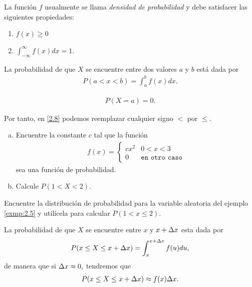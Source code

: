 	La función $f$ usualmente se llama \emph{densidad de probabilidad} y debe satisfacer las siguientes propiedades:
	\begin{enumerate}
		\item $f(x)\geq 0 $
		\item $\displaystyle \int_{-\infty}^{\infty}f(x)dx=1.$
	\end{enumerate}




	La probabilidad de que $X$ se encuentre entre dos valores $a$ y $b$ está dada por
	\begin{align}
		\label{2.8}
		P(a < x <b)=\int_{a}^{b}f(x)dx.
	\end{align}



	\begin{align}
		\label{exmp:2.4}
		P(X=a)=0.
	\end{align}


Por tanto, en \eqref{2.8} podemos reemplazar cualquier signo $<$ por $\leq.$


	\begin{ejemplo}
		\label{exmp:2.5}
		\begin{enumerate}[(a)]
			\item Encuentre la constante $c$ tal que la función
			\begin{align}
				f(x)=
				\begin{cases}
					cx^{2} & 0 < x < 3 \\
					0 & \texttt{en otro caso}
				\end{cases}
			\end{align}
			sea una función de probabilidad. 
			\item Calcule $P(1 < X < 2).$
		\end{enumerate}

	\end{ejemplo}



	\begin{ejemplo}
	  \label{exmp:2.6}
	  Encuentre la distribución de probabilidad para la variable aleatoria del ejemplo
	  \ref{exmp:2.5} y utilícela para calcular $P(1 < x \leq 2).$
	\end{ejemplo}



	La probabilidad de que $X$ se encuentre entre $x$ y $x+\Delta x$ esta dada por
	\begin{align}
		\label{2.9}
		P(x \leq X \leq x+\Delta x)= \int_{x}^{x+\Delta x}f(u)du,
	\end{align} 
	de manera que si $\Delta x \approx 0,$ tendremos que
	\begin{align}
		\label{2.10}
		P(x \leq X \leq x+\Delta x)\approx f(x) \Delta x.
	\end{align}



